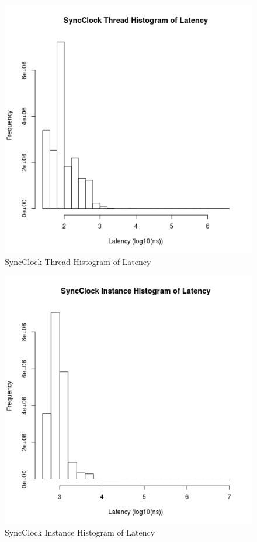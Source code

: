 \begin{figure}
\center
\includegraphics[height=.4\textheight]{sync_thread_latency_hist.png}
\caption{SyncClock Thread Histogram of Latency}
\label{sync_thread_latency}
\end{figure}

\begin{figure}
\center
\includegraphics[height=.4\textheight]{sync_instance_latency_hist.png}
\caption{SyncClock Instance Histogram of Latency}
\label{sync_instance_latency}
\end{figure}

